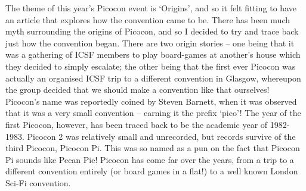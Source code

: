 The theme of this year’s Picocon event is ‘Origins’, and so it felt fitting to have an article that explores how the convention came to be. There has been much myth surrounding the origins of Picocon, and so I decided to try and trace back just how the convention began. There are two origin stories – one being that it was a gathering of ICSF members to play board-games at another’s house which they decided to simply escalate; the other being that the first ever Picocon was actually an organised ICSF trip to a different convention in Glasgow, whereupon the group decided that we should make a convention like that ourselves! Picocon’s name was reportedly coined by Steven Barnett, when it was observed that it was a very small convention – earning it the prefix ‘pico’! The year of the first Picocon, however, has been traced back to be the academic year of 1982-1983. Picocon 2 was relatively small and unrecorded, but records survive of the third Picocon, Picocon Pi. This was so named as a pun on the fact that Picocon Pi sounds like Pecan Pie! Picocon has come far over the years, from a trip to a different convention entirely (or board games in a flat!) to a well known London Sci-Fi convention. 